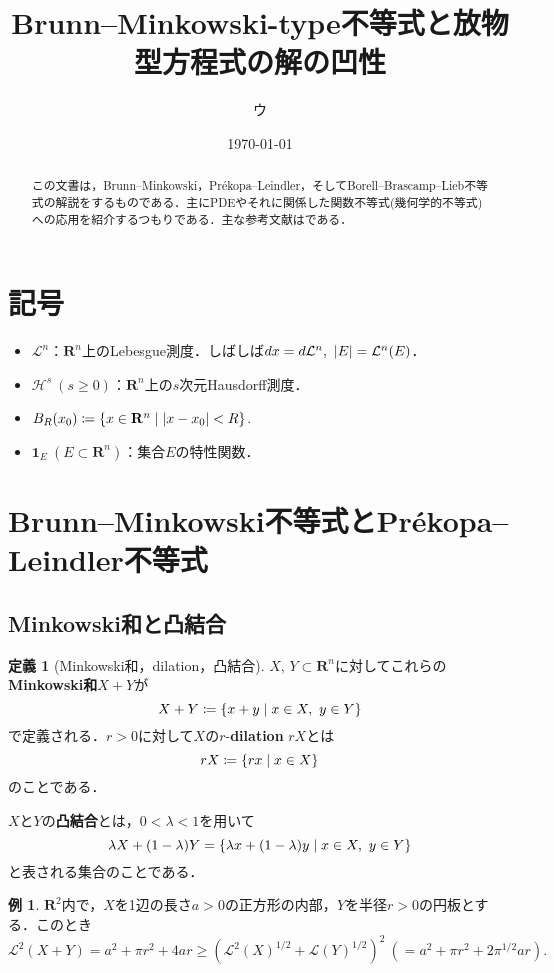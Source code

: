\documentclass[a4j]{ltjsarticle}
\newcommand{\Rset}{\mathbf{R}}
\newcommand{\Lm}{\mathcal{L}}
\newcommand{\Hm}{\mathcal{H}}
\newcommand{\1}{\bm{1}}
\numberwithin{equation}{section}
\theoremstyle{definition}
\newtheorem{dfn}[thm]{定義}
\newtheorem{eg}[thm]{例}
\begin{document}
\title{Brunn--Minkowski-type不等式と放物型方程式の解の凹性}
\author{ウ}
\date{\today}
\maketitle
\begin{abstract}
    この文書は，Brunn--Minkowski，Pr\'ekopa--Leindler，そしてBorell--Brascamp--Lieb不等式の解説をするものである．主にPDEやそれに関係した関数不等式(幾何学的不等式)への応用を紹介するつもりである．主な参考文献は\cites{BL,G,ILS}である．
\end{abstract}
\tableofcontents
\section*{記号}
\begin{itemize}
    \item $\Lm^n$：$\Rset^n$上のLebesgue測度．しばしば$dx=d\Lm^n,\ \abs{E}=\Lm^n(E)$．
    \item $\Hm^s\ (s\geq0)$：$\Rset^n$上の$s$次元Hausdorff測度．
    \item $B_R(x_0)\coloneqq \qty{x\in \Rset^n \mid \abs{x-x_0}<R}$.
    \item $\1_E\ (E\subset \Rset^n)$：集合$E$の特性関数．
\end{itemize}
\section{Brunn--Minkowski不等式とPr\'ekopa--Leindler不等式}
\subsection{Minkowski和と凸結合}
\begin{dfn}[Minkowski和，dilation，凸結合]
$X,\,Y\subset \Rset^n$に対してこれらの\textbf{Minkowski和}$X+Y$が
    \begin{equation}
        X+Y\coloneqq \qty{x+y\mid x\in X,\ y\in Y}
    \end{equation}
    で定義される．$r>0$に対して$X$の$r$-\textbf{dilation} $rX$とは 
    \begin{equation}
        rX\coloneqq \qty{rx\mid x\in X}
    \end{equation}
    のことである．
    
    $X$と$Y$の\textbf{凸結合}とは，$0<\lambda<1$を用いて
    \begin{equation}
        \lambda X+(1-\lambda)Y=\qty{\lambda x+(1-\lambda )y\mid x\in X,\ y\in Y}
    \end{equation}
    と表される集合のことである．
\end{dfn}
\begin{eg}
    $\Rset^2$内で，$X$を1辺の長さ$a>0$の正方形の内部，$Y$を半径$r>0$の円板とする．このとき
    \begin{equation}
        \Lm^2(X+Y)=a^2+\pi r^2+4ar\geq (\Lm^2(X)^{1/2}+\Lm(Y)^{1/2})^{2}\ (=a^2+\pi r^2+2\pi^{1/2}ar).
    \end{equation}
\end{eg}
\end{document}
